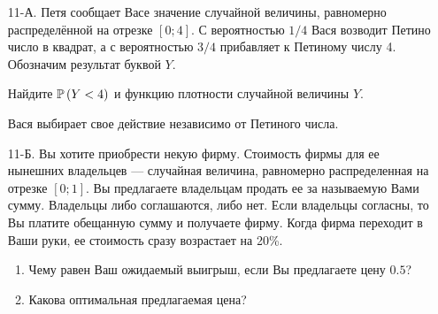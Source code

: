 \begin{enumerate}
\item[11-А.] Петя сообщает Васе значение случайной величины, равномерно распределённой
на отрезке $[0;4]$. С вероятностью $1/4$ Вася возводит Петино число в квадрат,
а с вероятностью $3/4$ прибавляет к Петиному числу 4. Обозначим результат буквой $Y$.

Найдите $\P\left(Y<4\right)$ и функцию плотности случайной величины $Y$.

Вася выбирает свое действие независимо от Петиного числа.

\item[11-Б.] Вы хотите приобрести некую фирму. Стоимость фирмы для ее нынешних
владельцев — случайная величина, равномерно распределенная на отрезке $[0;1]$.
Вы предлагаете владельцам продать ее за называемую Вами сумму. Владельцы либо
соглашаются, либо нет. Если владельцы согласны, то Вы платите обещанную сумму и
получаете фирму. Когда фирма переходит в Ваши руки, ее стоимость сразу возрастает на 20\%.
\begin{enumerate}
\item Чему равен Ваш ожидаемый выигрыш, если Вы предлагаете цену $0.5$?
\item Какова оптимальная предлагаемая цена?
\end{enumerate}
\end{enumerate}
